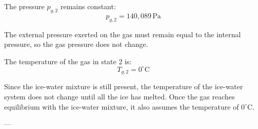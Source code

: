 The pressure \( p_{g,2} \) remains constant:  
\[
p_{g,2} = 140,089 \, \text{Pa}
\]  

The external pressure exerted on the gas must remain equal to the internal pressure, so the gas pressure does not change.  

The temperature of the gas in state 2 is:  
\[
T_{g,2} = 0^\circ\text{C}
\]  

Since the ice-water mixture is still present, the temperature of the ice-water system does not change until all the ice has melted. Once the gas reaches equilibrium with the ice-water mixture, it also assumes the temperature of \( 0^\circ\text{C} \).  

---
